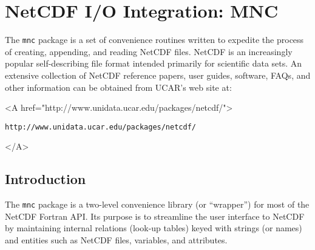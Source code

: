 
\section{NetCDF I/O Integration: MNC}
\label{sec:pkg:mnc}

The \texttt{mnc} package is a set of convenience routines written to
expedite the process of creating, appending, and reading NetCDF files.
NetCDF is an increasingly popular self-describing file format
\cite{rew:97} intended primarily for scientific data sets.  An
extensive collection of NetCDF reference papers, user guides,
software, FAQs, and other information can be obtained from UCAR's web
site at:
\begin{rawhtml} <A href="http://www.unidata.ucar.edu/packages/netcdf/"> \end{rawhtml}
\begin{verbatim}
http://www.unidata.ucar.edu/packages/netcdf/
\end{verbatim}
\begin{rawhtml} </A> \end{rawhtml}


\subsection{Introduction}

The \texttt{mnc} package is a two-level convenience library (or
``wrapper'') for most of the NetCDF Fortran API.  Its purpose is to
streamline the user interface to NetCDF by maintaining internal
relations (look-up tables) keyed with strings (or names) and entities
such as NetCDF files, variables, and attributes.

